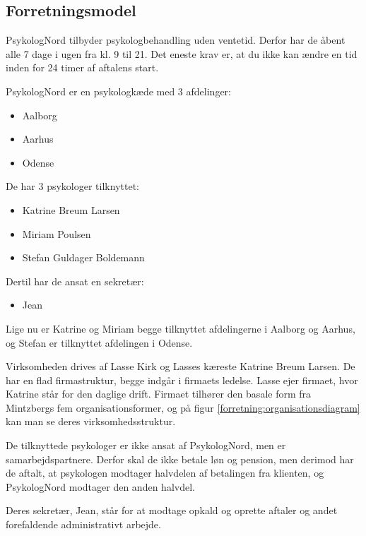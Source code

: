 \subsection{Forretningsmodel}
\label{section:forretningsmodel}

PsykologNord tilbyder psykologbehandling uden ventetid.
Derfor har de åbent alle 7 dage i ugen fra kl. 9 til 21. Det eneste krav er, at du ikke kan ændre en tid inden for 24 timer af aftalens start.

PsykologNord er en psykologkæde med 3 afdelinger:
\begin{itemize}
    \item Aalborg
    \item Aarhus
    \item Odense
\end{itemize}

De har 3 psykologer tilknyttet:

\begin{itemize}
    \item Katrine Breum Larsen
    \item Miriam Poulsen
    \item Stefan Guldager Boldemann
\end{itemize}

Dertil har de ansat en sekretær:

\begin{itemize}
	\item Jean
\end{itemize}

Lige nu er Katrine og Miriam begge tilknyttet afdelingerne i Aalborg og Aarhus, og Stefan er tilknyttet afdelingen i Odense.


Virksomheden drives af Lasse Kirk og Lasses kæreste Katrine Breum Larsen.
De har en flad firmastruktur, begge indgår i firmaets ledelse. Lasse ejer firmaet, hvor Katrine står for den daglige drift. 
Firmaet tilhører den basale form fra Mintzbergs fem organisationsformer, og på 
figur \ref{forretning:organisationsdiagram} kan man se deres virksomhedsstruktur.

De tilknyttede psykologer er ikke ansat af PsykologNord, men er samarbejdspartnere.
Derfor skal de ikke betale løn og pension, men derimod har de aftalt, at psykologen modtager halvdelen af betalingen fra klienten, og PsykologNord modtager den anden halvdel.

Deres sekretær, Jean, står for at modtage opkald og oprette aftaler og andet forefaldende administrativt arbejde.

